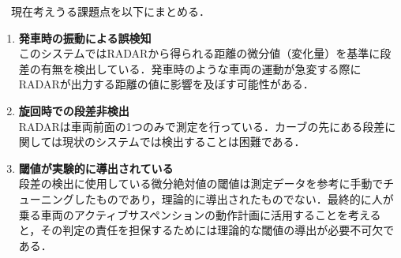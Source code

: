 　現在考えうる課題点を以下にまとめる．
\begin{enumerate}
    \item \textbf{発車時の振動による誤検知}\\
        このシステムではRADARから得られる距離の微分値（変化量）を基準に段差の有無を検出している．発車時のような車両の運動が急変する際にRADARが出力する距離の値に影響を及ぼす可能性がある．
    \item \textbf{旋回時での段差非検出}\\
        RADARは車両前面の1つのみで測定を行っている．カーブの先にある段差に関しては現状のシステムでは検出することは困難である．
    \item \textbf{閾値が実験的に導出されている}\\
        段差の検出に使用している微分絶対値の閾値は測定データを参考に手動でチューニングしたものであり，理論的に導出されたものでない．最終的に人が乗る車両のアクティブサスペンションの動作計画に活用することを考えると，その判定の責任を担保するためには理論的な閾値の導出が必要不可欠である．
\end{enumerate}
